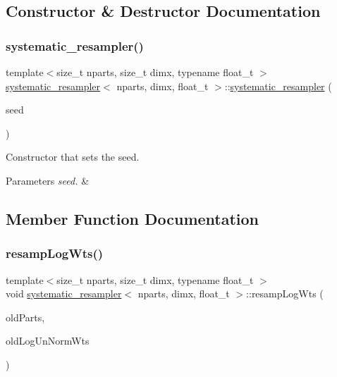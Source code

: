 \subsection{Constructor \& Destructor Documentation}
\mbox{\label{classsystematic__resampler_a815d21a8e8f3e715462e11752a73c2bd}} 
\subsubsection{\texorpdfstring{systematic\+\_\+resampler()}{systematic\_resampler()}}
{\footnotesize\ttfamily template$<$size\+\_\+t nparts, size\+\_\+t dimx, typename float\+\_\+t $>$ \\
\hyperlink{classsystematic__resampler}{systematic\+\_\+resampler}$<$ nparts, dimx, float\+\_\+t $>$\+::\hyperlink{classsystematic__resampler}{systematic\+\_\+resampler} (\begin{DoxyParamCaption}\item[{unsigned long}]{seed }\end{DoxyParamCaption})}



Constructor that sets the seed. 


\begin{DoxyParams}{Parameters}
{\em seed.} & \\
\hline
\end{DoxyParams}


\subsection{Member Function Documentation}
\mbox{\label{classsystematic__resampler_a9467aec6002043f35f40e9e4857021ed}} 
\subsubsection{\texorpdfstring{resamp\+Log\+Wts()}{resampLogWts()}}
{\footnotesize\ttfamily template$<$size\+\_\+t nparts, size\+\_\+t dimx, typename float\+\_\+t $>$ \\
void \hyperlink{classsystematic__resampler}{systematic\+\_\+resampler}$<$ nparts, dimx, float\+\_\+t $>$\+::resamp\+Log\+Wts (\begin{DoxyParamCaption}\item[{\hyperlink{classrbase_aa12fc826befa6ba0647b5f59ebc396ee}{array\+Vec} \&}]{old\+Parts,  }\item[{\hyperlink{classrbase_a6f76bef853e508cb5b6f546d231b06f5}{array\+Float} \&}]{old\+Log\+Un\+Norm\+Wts }\end{DoxyParamCaption})\hspace{0.3cm}{\ttfamily [virtual]}}



